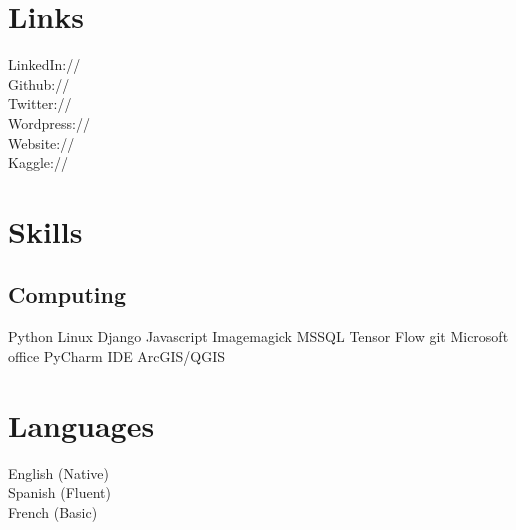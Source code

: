 \documentclass[]{deedy-resume-openfont}
\begin{document}
\begin{minipage}[t]{0.33\textwidth}

\section{Links}\label{sec:links}
LinkedIn://  \href{https://www.linkedin.com/in/jamesoconnor12/}{} \\
Github:// \href{https://github.com/JamesOConnor}{} \\
Twitter://  \href{https://twitter.com/James\_o\_connor1}{} \\
Wordpress://  \href{https://jamesoconnorkingston.wordpress.com}{} \\
Website://  \href{http://www.jp-oconnor.com}{} \\
Kaggle://  \href{https://www.kaggle.com/james0c}{}
\sectionsep


\section{Skills}\label{sec:skills}
\subsection{Computing}\label{subsec:computing}
Python \textbullet{} Linux \textbullet{} Django \textbullet{} Javascript \textbullet{} Imagemagick \textbullet{} MSSQL \textbullet{} Tensor Flow \textbullet{} git \linebreak
{}
Microsoft office \textbullet{} PyCharm IDE \textbullet{} ArcGIS/QGIS
\sectionsep


\section{Languages}\label{sec:languages}
English (Native) \\
Spanish (Fluent) \\
French (Basic) \\
\sectionsep

%
%

\end{minipage}
\end{document}
